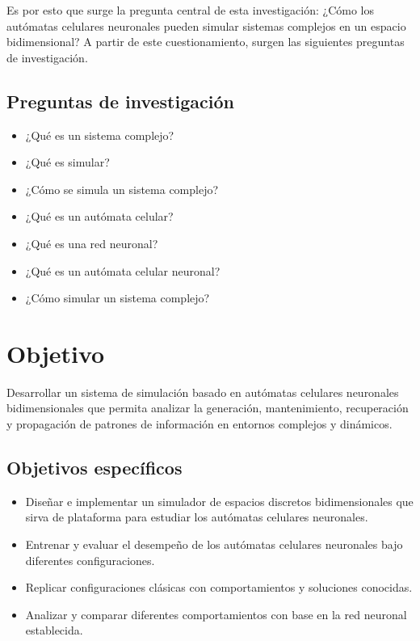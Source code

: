 Es por esto que surge la pregunta central de esta investigación: ¿Cómo los autómatas celulares neuronales pueden simular sistemas complejos en un espacio bidimensional? A partir de este cuestionamiento, surgen las siguientes preguntas de investigación.

\subsection{Preguntas de investigación}

\begin{itemize}
	
	\item ¿Qué es un sistema complejo?
	
	\item ¿Qué es simular?
	
	\item ¿Cómo se simula un sistema complejo?
	
	\item ¿Qué es un  autómata celular?
	
	\item ¿Qué es una red neuronal?
	
	\item ¿Qué es un autómata celular neuronal?
	
	\item ¿Cómo simular un sistema complejo?
	
\end{itemize}

\section{Objetivo}

Desarrollar un sistema de simulación basado en autómatas celulares neuronales bidimensionales que permita analizar la generación, mantenimiento, recuperación y propagación de patrones de información en entornos complejos y dinámicos.

\subsection{Objetivos específicos}

\begin{itemize}
	
	\item Diseñar e implementar un simulador de espacios discretos bidimensionales que sirva de plataforma para estudiar los autómatas celulares neuronales.
	
	\item Entrenar y evaluar el desempeño de los autómatas celulares neuronales bajo diferentes configuraciones.
	
	\item Replicar configuraciones clásicas con comportamientos y soluciones conocidas. 
	
	\item Analizar y comparar diferentes comportamientos con base en la red neuronal establecida.
	
\end{itemize}

